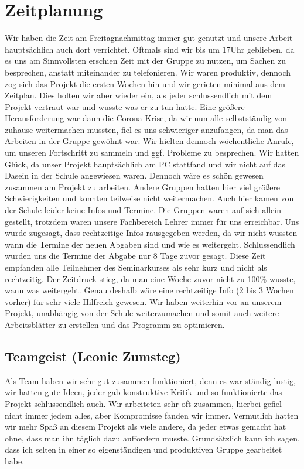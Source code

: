\documentclass[a4paper, 12pt]{article}
\begin{document}
\section{Zeitplanung}
Wir haben die Zeit am Freitagnachmittag immer gut genutzt und unsere Arbeit hauptsächlich auch dort verrichtet. Oftmals sind wir bis um 17Uhr geblieben, da es uns am Sinnvollsten erschien Zeit mit der Gruppe zu nutzen, um Sachen zu besprechen, anstatt miteinander zu telefonieren. Wir waren produktiv, dennoch zog sich das Projekt die ersten Wochen hin und wir gerieten minimal aus dem Zeitplan. Dies holten wir aber wieder ein, als jeder schlussendlich mit dem Projekt vertraut war und wusste was er zu tun hatte. Eine größere Herausforderung war dann die Corona-Krise, da wir nun alle selbstständig von zuhause weitermachen mussten, fiel es uns schwieriger anzufangen, da man das Arbeiten in der Gruppe gewöhnt war. Wir hielten dennoch wöchentliche Anrufe, um unseren Fortschritt zu sammeln und ggf. Probleme zu besprechen. Wir hatten Glück, da unser Projekt hauptsächlich am PC stattfand und wir nicht auf das Dasein in der Schule angewiesen waren. Dennoch wäre es schön gewesen zusammen am Projekt zu arbeiten. Andere Gruppen hatten hier viel größere Schwierigkeiten und konnten teilweise nicht weitermachen. Auch hier kamen von der Schule leider keine Infos und Termine. Die Gruppen waren auf sich allein gestellt, trotzdem waren unsere Fachbereich Lehrer immer für uns erreichbar.  Uns wurde zugesagt, dass rechtzeitige Infos rausgegeben werden, da wir nicht wussten wann die Termine der neuen Abgaben sind und wie es weitergeht. Schlussendlich wurden uns die Termine der Abgabe nur 8 Tage zuvor gesagt. Diese Zeit empfanden alle Teilnehmer des Seminarkurses als sehr kurz und nicht als rechtzeitig. Der Zeitdruck stieg, da man eine Woche zuvor nicht zu 100\% wusste, wann was weitergeht. Genau deshalb wäre eine rechtzeitige Info (2 bis 3 Wochen vorher) für sehr viele Hilfreich gewesen. Wir haben weiterhin vor an unserem Projekt, unabhängig von der Schule weiterzumachen und somit auch weitere Arbeitsblätter zu erstellen und das Programm zu optimieren.

\subsection{Teamgeist (Leonie Zumsteg)}
Als Team haben wir sehr gut zusammen funktioniert, denn es war ständig lustig, wir hatten gute Ideen, jeder gab konstruktive Kritik und so funktionierte das Projekt schlussendlich auch. Wir arbeiteten sehr oft zusammen, hierbei gefiel nicht immer jedem alles, aber Kompromisse fanden wir immer. Vermutlich hatten wir mehr Spaß an diesem Projekt als viele andere, da jeder etwas gemacht hat ohne, dass man ihn täglich dazu auffordern musste. Grundsätzlich kann ich sagen, dass ich selten in einer so eigenständigen und produktiven Gruppe gearbeitet habe. 
\end{document}
